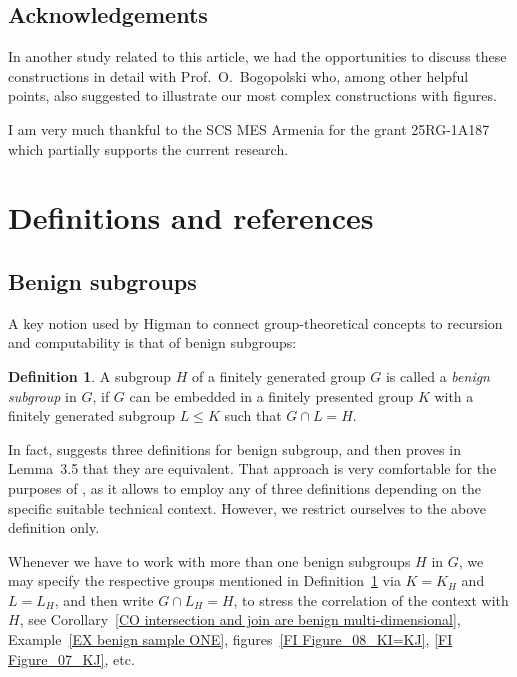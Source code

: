 \documentclass[12pt, a4paper]{amsart}
\newcommand{\1}{\{1\}}
\theoremstyle{plain}
\theoremstyle{definition}
\newtheorem{Definition}[Theorem]{Definition}
\theoremstyle{remark}
\numberwithin{equation}{section}
\begin{document}
\subsection*{Acknowledgements}
\label{SU Acknowledgements}

In another study related to this article, we had the opportunities to discuss these constructions in detail with Prof.~O.~Bogopolski who, among other helpful points, also suggested to illustrate our most complex constructions with figures.

I am very much thankful to the SCS MES Armenia for the grant 25RG-1A187 which partially supports the current research.








\section{Definitions and references}

\subsection{Benign subgroups}
\label{SU Benign subgroups}

A key notion used by Higman to connect group-theo\-reti\-cal concepts to recursion and computability is that of benign subgroups:

\begin{Definition}
\label{DE benign subgroup}
A subgroup $H$ of a finitely generated group $G$ is called a \textit{benign subgroup} in $G$, if $G$ can be embedded in a finitely presented group $K$ with a finitely generated subgroup $L\le K$ such that $G \cap L = H$.
\end{Definition} 

In fact, \cite{Higman Subgroups of fP groups} suggests three definitions for benign subgroup, and then proves in Lemma~3.5 that they are equivalent. That approach is very comfortable for the purposes of \cite{Higman Subgroups of fP groups}, as it allows to employ any of three definitions depending on the specific suitable technical context. 
However, we restrict ourselves to the above definition only.

\smallskip
Whenever we have to work with more than one benign subgroups $H$ in $G$, we may specify the respective groups mentioned in Definition~\ref{DE benign subgroup} via $K=K_H$ and $L=L_H$, and then write $G \cap L_H = H$, to stress the correlation of the context with $H$, see Corollary~\ref{CO intersection and join are benign multi-dimensional}, 
Example~\ref{EX benign sample ONE},
figures~\ref{FI Figure_08_KI=KJ}, \ref{FI Figure_07_KJ}, etc.
\end{document}
